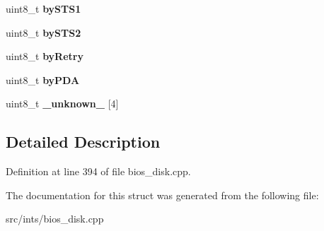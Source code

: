 \begin{DoxyCompactItemize}
\item 
\hypertarget{structNFDHDR__ENTRY_abec47658947ee28c2e4ca8c4dd4f8e67}{uint8\-\_\-t {\bfseries by\-S\-T\-S1}}\label{structNFDHDR__ENTRY_abec47658947ee28c2e4ca8c4dd4f8e67}

\item 
\hypertarget{structNFDHDR__ENTRY_a76165625648c61f101c79870a495fc2e}{uint8\-\_\-t {\bfseries by\-S\-T\-S2}}\label{structNFDHDR__ENTRY_a76165625648c61f101c79870a495fc2e}

\item 
\hypertarget{structNFDHDR__ENTRY_a47f3e2a7112f5459ec0eb59768949f3e}{uint8\-\_\-t {\bfseries by\-Retry}}\label{structNFDHDR__ENTRY_a47f3e2a7112f5459ec0eb59768949f3e}

\item 
\hypertarget{structNFDHDR__ENTRY_ac530386ff5d24cafbb8c6df6cbfb12d8}{uint8\-\_\-t {\bfseries by\-P\-D\-A}}\label{structNFDHDR__ENTRY_ac530386ff5d24cafbb8c6df6cbfb12d8}

\item 
\hypertarget{structNFDHDR__ENTRY_a2382030bc4ae46a87214367d4e8f978b}{uint8\-\_\-t {\bfseries \-\_\-unknown\-\_\-} \mbox{[}4\mbox{]}}\label{structNFDHDR__ENTRY_a2382030bc4ae46a87214367d4e8f978b}

\end{DoxyCompactItemize}


\subsection{Detailed Description}


Definition at line 394 of file bios\-\_\-disk.\-cpp.



The documentation for this struct was generated from the following file\-:\begin{DoxyCompactItemize}
\item 
src/ints/bios\-\_\-disk.\-cpp\end{DoxyCompactItemize}
